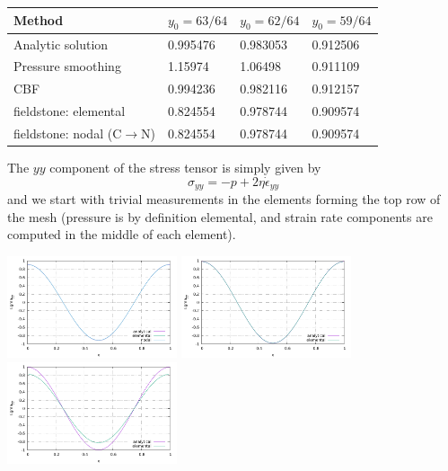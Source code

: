 \begin{center}
\begin{tabular}{l||lll}
\hline
Method             & $y_0=63/64$ & $y_0=62/64$ &  $y_0=59/64$ \\ 
\hline
\hline
Analytic solution  & 0.995476    & 0.983053    &  0.912506 \\
Pressure smoothing & 1.15974     & 1.06498     &  0.911109 \\
CBF                & 0.994236    & 0.982116    &  0.912157 \\
\hline
fieldstone: elemental    &  0.824554 &  0.978744  & 0.909574 \\
fieldstone: nodal (C$\rightarrow$N) & 0.824554 &   0.978744 & 0.909574 \\
\hline
\end{tabular}
\end{center}

The $yy$ component of the stress tensor is simply given by
\[
\sigma_{yy} = -p + 2 \eta \dot{\epsilon}_{yy}
\]
and we start with trivial measurements in the elements 
forming the top row of the mesh (pressure is by definition elemental, and strain rate
components are computed in the middle of each element). 

\begin{center}
\includegraphics[width=5cm]{python_codes/fieldstone_27/results/59_64/sigmazz.pdf}
\includegraphics[width=5cm]{python_codes/fieldstone_27/results/62_64/sigmazz.pdf}
\includegraphics[width=5cm]{python_codes/fieldstone_27/results/63_64/sigmazz.pdf}
\end{center}






